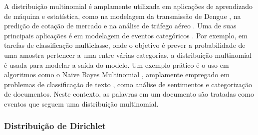 A distribuição multinomial \cite{seber2015-multi} é amplamente utilizada em aplicações de aprendizado de máquina e estatística, como na modelagem da transmissão de Dengue \cite{wang2025}, na predição de cotação de mercado \cite{nevasalmi2020} e na análise de tráfego aéreo \cite{torres2023}. Uma de suas principais aplicações é em modelagem de eventos categóricos \cite{kibriya2004,luo2021}. Por exemplo, em tarefas de classificação multiclasse, onde o objetivo é prever a probabilidade de uma amostra pertencer a uma entre várias categorias, a distribuição multinomial é usada para modelar a saída do modelo. Um exemplo prático é o uso em algoritmos como o Naive Bayes Multinomial \cite{kalcheva2023,jiang2016}, amplamente empregado em problemas de classificação de texto \cite{odeh2022,kan2005}, como análise de sentimentos \cite{saravanan2023} e categorização de documentos. Neste contexto, as palavras em um documento são tratadas como eventos que seguem uma distribuição multinomial.





\subsubsection{Distribuição de Dirichlet}
\label{sec:modelo-dir}


